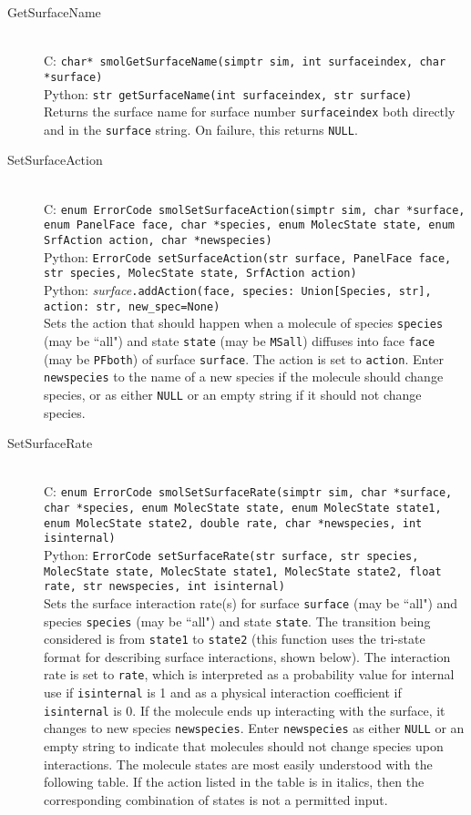 \documentclass {book}
\newcommand {\ttt} {\texttt}
\begin{document}
\begin{description}
\item[GetSurfaceName]
\hfill \\
C: \ttt{char* smolGetSurfaceName(simptr sim, int surfaceindex, char *surface)}\\
Python: \ttt{str getSurfaceName(int surfaceindex, str surface)}\\
Returns the surface name for surface number \ttt{surfaceindex} both directly and in the \ttt{surface} string. On failure, this returns \ttt{NULL}.

\item[SetSurfaceAction]
\hfill \\
C: \ttt{enum ErrorCode smolSetSurfaceAction(simptr sim, char *surface, enum PanelFace face, char *species, enum MolecState state, enum SrfAction action, char *newspecies)}\\
Python: \ttt{ErrorCode setSurfaceAction(str surface, PanelFace face, str species, MolecState state, SrfAction action)}\\
Python: \textit{surface}\ttt{.addAction(face, species: Union[Species, str], action: str, new\_spec=None)}\\
Sets the action that should happen when a molecule of species \ttt{species} (may be ``all") and state \ttt{state} (may be \ttt{MSall}) diffuses into face \ttt{face} (may be \ttt{PFboth}) of surface \ttt{surface}. The action is set to \ttt{action}. Enter \ttt{newspecies} to the name of a new species if the molecule should change species, or as either \ttt{NULL} or an empty string if it should not change species.

\item[SetSurfaceRate]
\hfill \\
C: \ttt{enum ErrorCode smolSetSurfaceRate(simptr sim, char *surface, char *species, enum MolecState state, enum MolecState state1, enum MolecState state2, double rate, char *newspecies, int isinternal)}\\
Python: \ttt{ErrorCode setSurfaceRate(str surface, str species, MolecState state, MolecState state1, MolecState state2, float rate, str newspecies, int isinternal)}\\
Sets the surface interaction rate(s) for surface \ttt{surface} (may be ``all") and species \ttt{species} (may be ``all") and state \ttt{state}. The transition being considered is from \ttt{state1} to \ttt{state2} (this function uses the tri-state format for describing surface interactions, shown below). The interaction rate is set to \ttt{rate}, which is interpreted as a probability value for internal use if \ttt{isinternal} is 1 and as a physical interaction coefficient if \ttt{isinternal} is 0. If the molecule ends up interacting with the surface, it changes to new species \ttt{newspecies}. Enter \ttt{newspecies} as either \ttt{NULL} or an empty string to indicate that molecules should not change species upon interactions. The molecule states are most easily understood with the following table. If the action listed in the table is in italics, then the corresponding combination of states is not a permitted input.


\end{description}
\end{document}
